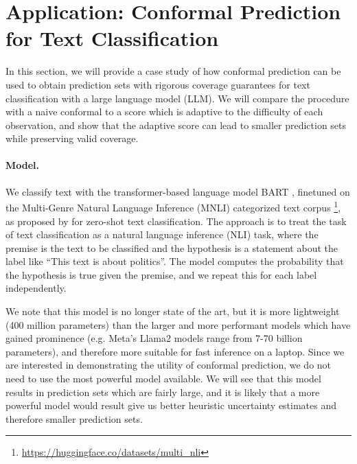 \documentclass[a4paper, 12pt]{article}
\begin{document}
\section{Application: Conformal Prediction for Text Classification}
\label{sec:application}
In this section, we will provide a case study of how conformal prediction can be used to obtain
prediction sets with rigorous coverage guarantees for text classification with a large language model (LLM). We will compare the procedure with a naive conformal to a score which is adaptive to the difficulty of each observation, and show that the adaptive score can lead to smaller prediction sets while preserving valid coverage.

\paragraph*{Model.} We classify text with the transformer-based language model BART \autocite{lewisBARTDenoisingSequencetoSequence2019},
finetuned on the Multi-Genre Natural Language Inference (MNLI) categorized text corpus \footnote{\url{https://huggingface.co/datasets/multi_nli}},
as proposed by \textcite{yinBenchmarkingZeroshotText2019} for zero-shot text classification. The approach is to treat the task of text classification as a natural language inference (NLI) task, where the premise is the text to be classified and the hypothesis is a statement about the label like ``This text is about politics''. The model computes the probability that the hypothesis is true given the premise, and we repeat this for each label independently.

We note that this model is no longer state of the art, but it is more lightweight (400 million parameters) than the larger and more performant models which have gained prominence (e.g. Meta's Llama2 models range from 7-70 billion parameters), and therefore more suitable for fast inference on a laptop.
Since we are interested in demonstrating the utility of conformal prediction, we do not need to use the most powerful model available.
We will see that this model results in prediction sets which are fairly large, and it is likely that a more powerful model would result give us better heuristic uncertainty estimates and therefore smaller prediction sets.
\end{document}
